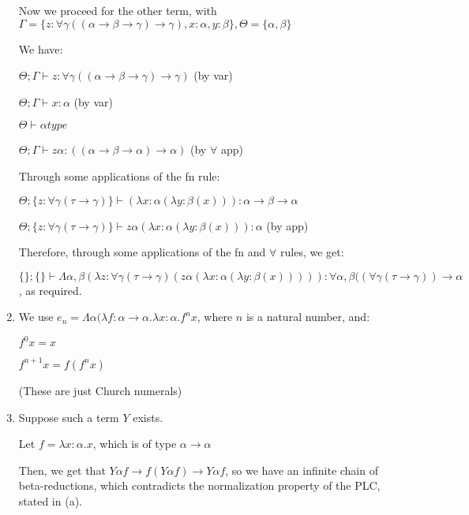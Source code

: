 \begin{enumerate}[label=(\alph*)]
  Now we proceed for the other term, with $\Gamma = \{z : \forall \gamma ((\alpha \rightarrow \beta \rightarrow \gamma) \rightarrow\gamma), x : \alpha, y : \beta\}, \Theta = \{\alpha, \beta\}$

  We have:

  $\Theta;\Gamma \vdash z : \forall \gamma ((\alpha \rightarrow \beta \rightarrow \gamma) \rightarrow \gamma)$ (by var)

  $\Theta;\Gamma \vdash x : \alpha$ (by var)

  $\Theta \vdash \alpha type$

  $\Theta;\Gamma \vdash z \alpha : ((\alpha \rightarrow \beta \rightarrow \alpha) \rightarrow \alpha)$ (by $\forall$ app)

  Through some applications of the fn rule:

  $\Theta;\{z : \forall \gamma (\tau \rightarrow \gamma)\} \vdash (\lambda x : \alpha (\lambda y : \beta (x))) : \alpha \rightarrow \beta \rightarrow \alpha$

  $\Theta;\{z : \forall \gamma (\tau \rightarrow \gamma)\} \vdash z \alpha (\lambda x : \alpha (\lambda y : \beta (x))) : \alpha$ (by app)

  Therefore, through some applications of the fn and $\forall$ rules, we get:

  $\{\};\{\} \vdash \Lambda \alpha,\beta (\lambda z : \forall \gamma(\tau \rightarrow \gamma)(z \alpha (\lambda x : \alpha(\lambda y : \beta(x))))) : \forall \alpha, \beta((\forall \gamma (\tau \rightarrow \gamma)) \rightarrow \alpha$, as required.

\item

  We use $e_n = \Lambda \alpha(\lambda f : \alpha \rightarrow \alpha. \lambda x : \alpha. f^n x$, where $n$ is a natural number, and:

  $f^0 x = x$

  $f^{n+1}x = f (f^n x)$

  (These are just Church numerals)

\item

  Suppose such a term $Y$ exists.

  Let $f = \lambda x : \alpha. x$, which is of type $\alpha \rightarrow \alpha$

  Then, we get that $Y \alpha f \rightarrow f (Y \alpha f) \rightarrow Y \alpha f$, so we have an infinite chain of beta-reductions, which contradicts the normalization property of the PLC, stated in (a).














        
\end{enumerate}

